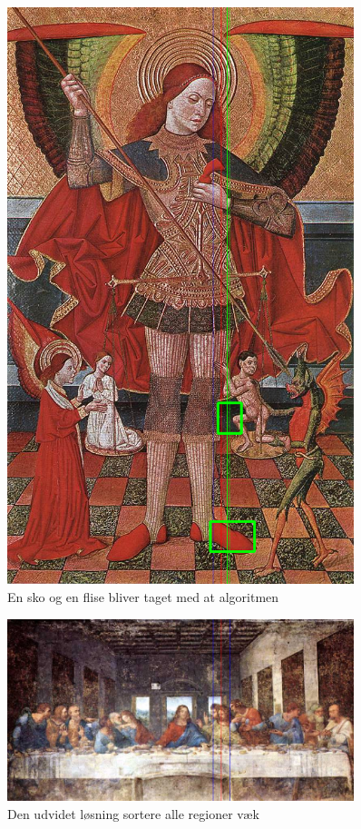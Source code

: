 \begin{figure}[h!!]
	\begin{center}
		\includegraphics[width=0.9\textwidth,angle=0]{afsnit/afprovning/billeder/udvidet_losning/udvidet_kfarver_kdetaljer.png}
	\end{center}
	\caption[]{En sko og en flise bliver taget med at algoritmen}
	\label{udvidet_virker_ikke1}
\end{figure}

\begin{figure}[h!!]
	\begin{center}
		\includegraphics[width=0.9\textwidth,angle=0]{afsnit/afprovning/billeder/udvidet_losning/udvidet_mfarver_mdetaljer.png}
	\end{center}
	\caption[]{Den udvidet løsning sortere alle regioner væk}
	\label{udvidet_virker_ikke2}
\end{figure}

